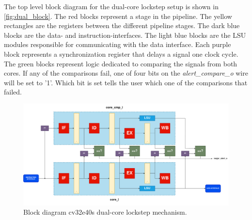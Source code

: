 The top level block diagram for the dual-core lockstep setup is shown in \autoref{fig:dual_block}. The red blocks represent a stage in the pipeline. The yellow rectangles are the registers between the different pipeline stages. The dark blue blocks are the data- and instruction-interfaces. The light blue blocks are the LSU modules responsible for communicating with the data interface. Each purple block represents a synchronization register that delays a signal one clock cycle. The green blocks represent logic dedicated to comparing the signals from both cores. If any of the comparisons fail, one of four bits on the \textit{alert\_compare\_o} wire will be set to '1'. Which bit is set tells the user which one of the comparisons that failed.  

\begin{figure}[ht!]
    \centering
    \includegraphics[width=\textwidth]{docs/images/dual_cores-block.png}
    \caption{Block diagram cv32e40s dual-core lockstep mechanism.}
    \label{fig:dual_block}
\end{figure}
